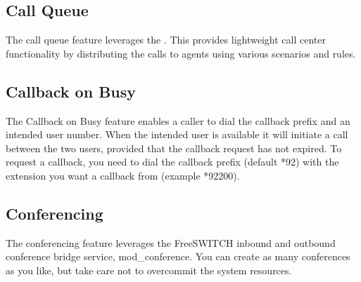 \documentclass[letterpaper,10pt,english]{sphinxmanual}
\begin{document}
\subsection{Call Queue}
\label{\detokenize{webui:call-queue}}\label{\detokenize{webui:id10}}
The call queue feature leverages the .
This provides lightweight call center functionality by distributing the calls to agents using various scenarios and rules.
\begin{quote}

\end{quote}


\subsection{Callback on Busy}
\label{\detokenize{webui:callback-on-busy}}\label{\detokenize{webui:id11}}
The Callback on Busy feature enables a caller to dial the callback prefix and an intended user number.
When the intended user is available it will initiate a call between the two users, provided that the callback request has not expired.
To request a callback, you need to dial the callback prefix (default *92) with the extension you want a callback from (example *92200).
\begin{quote}

\end{quote}


\subsection{Conferencing}
\label{\detokenize{webui:conferencing}}\label{\detokenize{webui:id12}}
The conferencing feature leverages the FreeSWITCH inbound and outbound conference bridge service, mod\_conference. You can create as many conferences as you like, but take care not to overcommit the system resources.
\begin{quote}

\end{quote}
\end{document}
